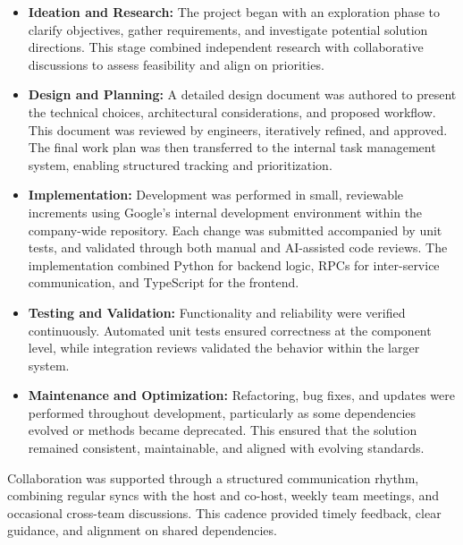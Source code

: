 \begin{spacing}{1.2}
\begin{itemize}
    \item \textbf{Ideation and Research:} The project began with an exploration phase to clarify objectives, gather requirements, and investigate potential solution directions. This stage combined independent research with collaborative discussions to assess feasibility and align on priorities.
    
    \item \textbf{Design and Planning:} A detailed design document was authored to present the technical choices, architectural considerations, and proposed workflow. This document was reviewed by engineers, iteratively refined, and approved. The final work plan was then transferred to the internal task management system, enabling structured tracking and prioritization.
    
    \item \textbf{Implementation:} Development was performed in small, reviewable increments using Google’s internal development environment within the company-wide repository. Each change was submitted accompanied by unit tests, and validated through both manual and AI-assisted code reviews. The implementation combined Python for backend logic, RPCs for inter-service communication, and TypeScript for the frontend.
    
    \item \textbf{Testing and Validation:} Functionality and reliability were verified continuously. Automated unit tests ensured correctness at the component level, while integration reviews validated the behavior within the larger system.
    
    \item \textbf{Maintenance and Optimization:} Refactoring, bug fixes, and updates were performed throughout development, particularly as some dependencies evolved or methods became deprecated. This ensured that the solution remained consistent, maintainable, and aligned with evolving standards.
\end{itemize}

Collaboration was supported through a structured communication rhythm, combining regular syncs with the host and co-host, weekly team meetings, and occasional cross-team discussions. This cadence provided timely feedback, clear guidance, and alignment on shared dependencies.


\end{spacing}
